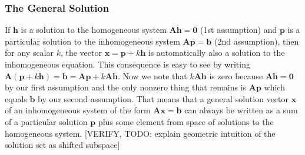 \subsubsection{The General Solution}
If $\mathbf{h}$ is a solution to the homogeneous system $\mathbf{A h = 0}$ (1st assumption) and $\mathbf{p}$ is a particular solution to the inhomogeneous system $\mathbf{A p = b}$ (2nd assumption), then for any scalar $k$, the vector $\mathbf{x} = \mathbf{p} + k \mathbf{h}$ is automatically also a solution to the inhomogeneous equation. This consequence is easy to see by writing $\mathbf{A} (\mathbf{p} + k \mathbf{h}) = \mathbf{b} = \mathbf{A p} + k \mathbf{A h}$. Now we note that $k \mathbf{A h}$ is zero because $\mathbf{A h = 0}$ by our first assumption and the only nonzero thing that remains is $\mathbf{A p}$ which equals $\mathbf{b}$ by our second assumption. That means that a general solution vector $\mathbf{x}$ of an inhomogeneous system of the form $\mathbf{A x = b}$ can always be written as a sum of a particular solution $\mathbf{p}$ plus some element from space of solutions to the homogeneous system. [VERIFY, TODO: explain geometric intuition of the solution set as shifted subspace]







